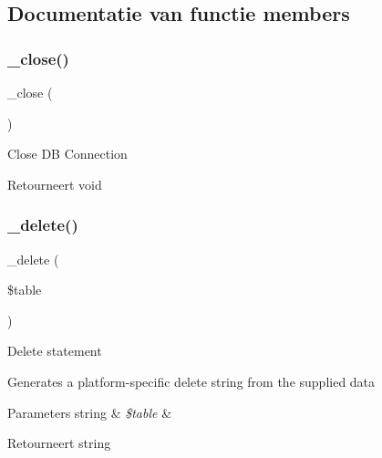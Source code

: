 \subsection{Documentatie van functie members}
\mbox{\label{class_c_i___d_b__ibase__driver_a4d9082658000e5ede8312067c6dda9db}} 
\subsubsection{\texorpdfstring{\_close()}{\_close()}}
{\footnotesize\ttfamily \+\_\+close (\begin{DoxyParamCaption}{ }\end{DoxyParamCaption})\hspace{0.3cm}{\ttfamily [protected]}}

Close DB Connection

\begin{DoxyReturn}{Retourneert}
void 
\end{DoxyReturn}
\mbox{\label{class_c_i___d_b__ibase__driver_a133ea8446ded52589bd22cc9163d0896}} 
\subsubsection{\texorpdfstring{\_delete()}{\_delete()}}
{\footnotesize\ttfamily \+\_\+delete (\begin{DoxyParamCaption}\item[{}]{\$table }\end{DoxyParamCaption})\hspace{0.3cm}{\ttfamily [protected]}}

Delete statement

Generates a platform-\/specific delete string from the supplied data


\begin{DoxyParams}[1]{Parameters}
string & {\em \$table} & \\
\hline
\end{DoxyParams}
\begin{DoxyReturn}{Retourneert}
string 
\end{DoxyReturn}
\mbox{\label{class_c_i___d_b__ibase__driver_a114ab675d89bf8324a41785fb475e86d}} 
